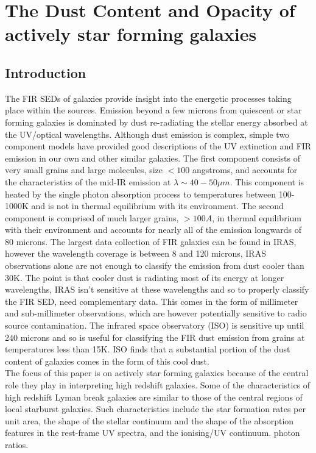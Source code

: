 \documentclass{literature}
\begin{document}

\section{The Dust Content and Opacity of actively star forming galaxies}\label{sec:Calzetti law}
\subsection{Introduction}
The FIR SEDs of galaxies provide insight into the energetic processes taking place within the sources. Emission beyond a few microns from quiescent or star forming galaxies is dominated by dust re-radiating the stellar energy absorbed at the UV/optical wavelengths. Although dust emission is complex, simple two component models have provided good descriptions of the UV extinction and FIR emission in our own and other similar galaxies. The first component consists of very small grains and large molecules, size $<100$ angstroms, and accounts for the characteristics of the mid-IR emission at $\lambda \sim 40-50\mu m$. This component is heated by the single photon absorption process to temperatures between 100-1000K and is not in thermal equilibrium with its environment. The second component is comprised of much larger grains, $> 100A$, in thermal equilibrium with their environment and accounts for nearly all of the emission longwards of 80 microns. The largest data collection of FIR galaxies can be found in IRAS, however the wavelength coverage is between 8 and 120 microns, IRAS observations alone are not enough to classify the emission from dust cooler than 30K. The point is that cooler dust is radiating most of its energy at longer wavelengths, IRAS isn't sensitive at these wavelengths and so to properly classify the FIR SED, need complementary data. This comes in the form of millimeter and sub-millimeter observations, which are however potentially sensitive to radio source contamination. The infrared space observatory (ISO) is sensitive up until 240 microns and so is useful for classifying the FIR dust emission from grains at temperatures less than 15K. ISO finds that a substantial portion of the dust content of galaxies comes in the form of this cool dust. \\
The focus of this paper is on actively star forming galaxies because of the central role they play in interpreting high redshift galaxies. Some of the characteristics of high redshift Lyman break galaxies are similar to those of the central regions of local starburst galaxies. Such characteristics include the star formation rates per unit area, the shape of the stellar continuum and the shape of the absorption features in the rest-frame UV spectra, and the ionising/UV continuum. photon ratios. 
\end{document}
